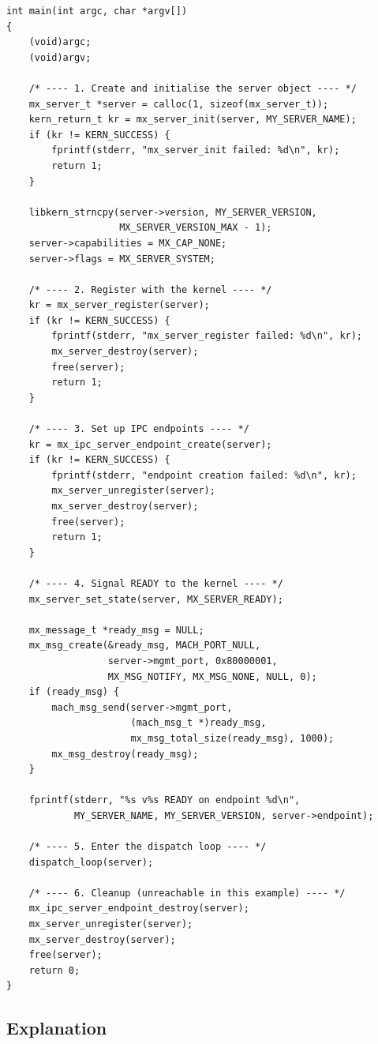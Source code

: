 \documentclass[a4paper,11pt]{article}
\begin{document}
\begin{lstlisting}
int main(int argc, char *argv[])
{
    (void)argc;
    (void)argv;

    /* ---- 1. Create and initialise the server object ---- */
    mx_server_t *server = calloc(1, sizeof(mx_server_t));
    kern_return_t kr = mx_server_init(server, MY_SERVER_NAME);
    if (kr != KERN_SUCCESS) {
        fprintf(stderr, "mx_server_init failed: %d\n", kr);
        return 1;
    }

    libkern_strncpy(server->version, MY_SERVER_VERSION,
                    MX_SERVER_VERSION_MAX - 1);
    server->capabilities = MX_CAP_NONE;
    server->flags = MX_SERVER_SYSTEM;

    /* ---- 2. Register with the kernel ---- */
    kr = mx_server_register(server);
    if (kr != KERN_SUCCESS) {
        fprintf(stderr, "mx_server_register failed: %d\n", kr);
        mx_server_destroy(server);
        free(server);
        return 1;
    }

    /* ---- 3. Set up IPC endpoints ---- */
    kr = mx_ipc_server_endpoint_create(server);
    if (kr != KERN_SUCCESS) {
        fprintf(stderr, "endpoint creation failed: %d\n", kr);
        mx_server_unregister(server);
        mx_server_destroy(server);
        free(server);
        return 1;
    }

    /* ---- 4. Signal READY to the kernel ---- */
    mx_server_set_state(server, MX_SERVER_READY);

    mx_message_t *ready_msg = NULL;
    mx_msg_create(&ready_msg, MACH_PORT_NULL,
                  server->mgmt_port, 0x80000001,
                  MX_MSG_NOTIFY, MX_MSG_NONE, NULL, 0);
    if (ready_msg) {
        mach_msg_send(server->mgmt_port,
                      (mach_msg_t *)ready_msg,
                      mx_msg_total_size(ready_msg), 1000);
        mx_msg_destroy(ready_msg);
    }

    fprintf(stderr, "%s v%s READY on endpoint %d\n",
            MY_SERVER_NAME, MY_SERVER_VERSION, server->endpoint);

    /* ---- 5. Enter the dispatch loop ---- */
    dispatch_loop(server);

    /* ---- 6. Cleanup (unreachable in this example) ---- */
    mx_ipc_server_endpoint_destroy(server);
    mx_server_unregister(server);
    mx_server_destroy(server);
    free(server);
    return 0;
}
\end{lstlisting}

\subsection{Explanation}
\end{document}
